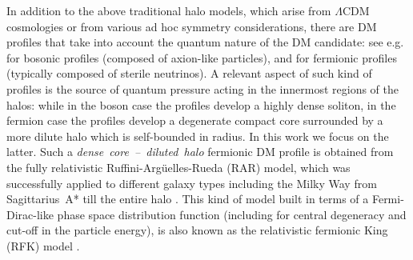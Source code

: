 \documentclass[twocolumn]{aa}
\begin{document}
In addition to the above traditional halo models, which arise from $\Lambda$CDM cosmologies or from various ad hoc symmetry considerations, there are DM profiles that take into account the quantum nature of the DM candidate: see e.g. \cite{2014NatPh..10..496S} for bosonic profiles (composed of axion-like particles), and \cite{2015MNRAS.451..622R,2015PhRvD..92l3527C,2021MNRAS.502.4227A} for fermionic profiles (typically composed of sterile neutrinos). A relevant aspect of such kind of profiles is the source of quantum pressure acting in the innermost regions of the halos: while in the boson case the profiles develop a highly dense soliton, in the fermion case the profiles develop a degenerate compact core surrounded by a more dilute halo which is self-bounded in radius. In this work we focus on the latter. Such a \emph{dense~core~--~diluted~halo} fermionic DM profile is obtained from the fully relativistic Ruffini-Argüelles-Rueda (RAR) model, which was successfully applied to different galaxy types \citep{2019PDU....24..278A,2023ApJ...945....1K} including the Milky Way from Sagittarius~A* till the entire halo \citep{arguelles_novel_2018,2020A&A...641A..34B,2021MNRAS.505L..64B,2022MNRAS.511L..35A}.
This kind of model built in terms of a Fermi-Dirac-like phase space distribution function (including for central degeneracy and cut-off in the particle energy), is also known as the relativistic fermionic King (RFK) model \citep{2022PhRvD.106d3538C}.

\end{document}
